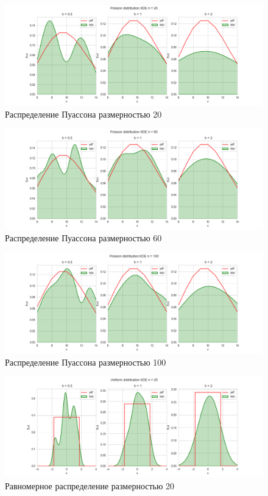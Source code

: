 \documentclass[a4paper,14pt]{article}
\begin{document}
	\begin{figure}[H]
		\centering
		\includegraphics[scale=0.48]{./lab1_4/pictures/Poisson distributionKDE20.png}
		\caption{Распределение Пуассона размерностью 20}
	\end{figure}
	
	\begin{figure}[H]
		\centering
		\includegraphics[scale=0.48]{./lab1_4/pictures/Poisson distributionKDE60.png}
		\caption{Распределение Пуассона размерностью 60}
	\end{figure}
	
	\begin{figure}[H]
		\centering
		\includegraphics[scale=0.48]{./lab1_4/pictures/Poisson distributionKDE100.png}
		\caption{Распределение Пуассона размерностью 100}
	\end{figure}
	
	\begin{figure}[H]
		\centering
		\includegraphics[scale=0.48]{./lab1_4/pictures/Uniform distributionKDE20.png}
		\caption{Равномерное распределение размерностью 20}
	\end{figure}
	
\end{document}
